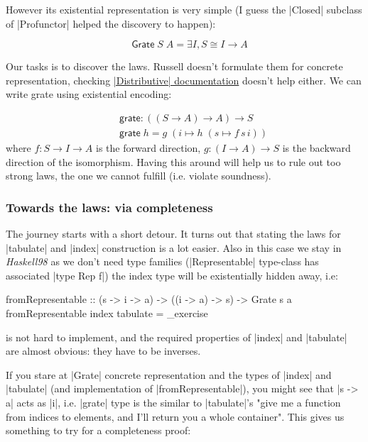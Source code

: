 \documentclass{article}
\begin{document}
However its existential representation is very simple
(I guess the |Closed| subclass of |Profunctor| helped the discovery to happen):

\begin{equation}
\quad \mathsf{Grate}\;S\;A = \exists I, S \cong I \to A
\end{equation}

Our tasks is to discover the laws. Russell doesn't formulate them for
concrete representation, checking
\href{http://hackage.haskell.org/package/distributive-0.6/docs/Data-Distributive.html}{|Distributive| documentation}
doesn't help either. We can write grate using existential encoding:

\begin{equation}
\begin{aligned}
  \quad & \mathsf{grate} : ((S \to A) \to A) \to S \\
        & \mathsf{grate}\; h = g\; (i \mapsto h\; (s \mapsto f\, s\, i))
\end{aligned}
\end{equation}
where $f : S \to I \to A$ is the forward direction,
$g : (I \to A) \to S $ is the backward direction of the isomorphism.
Having this around will help us to rule out too strong laws, the one
we cannot fulfill (i.e. violate soundness).

\subsubsection{Towards the laws: via completeness}

The journey starts with a short detour. It turns out that stating the laws
for |tabulate| and |index| construction is a lot easier.
Also in this case we stay in \emph{Haskell98} as we don't need type families
(|Representable| type-class has associated |type Rep f|)
the index type will be existentially hidden away, i.e:

\begin{code}
fromRepresentable :: (s -> i -> a) -> ((i -> a) -> s) -> Grate s a
fromRepresentable index tabulate = _exercise
\end{code}

is not hard to implement, and the required properties of |index| and |tabulate|
are almost obvious: they have to be inverses.

If you stare at |Grate| concrete representation and the types of |index| and
|tabulate| (and implementation of |fromRepresentable|), you might see
that |s -> a| acts as |i|, i.e. |grate| type is the similar to |tabulate|'s
"give me a function from indices to elements, and I'll return you a whole container".
This gives us something to try for a completeness proof:
\end{document}
